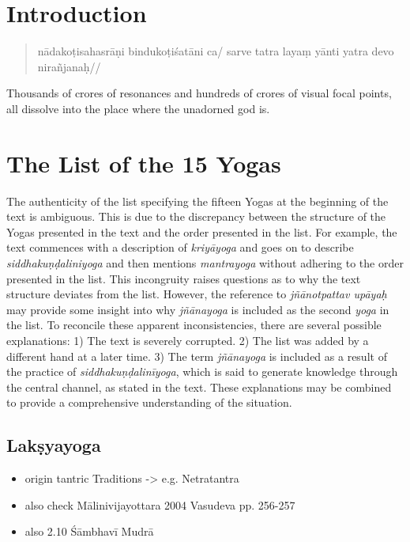 \chapter{Introduction}
\mainmatter

\begin{quote}
nādakoṭisahasrāṇi bindukoṭiśatāni ca/
sarve tatra layaṃ yānti yatra devo nirañjanaḥ//
\end{quote}

Thousands of crores of resonances and hundreds of crores of visual focal points, all dissolve into the place where the unadorned god is.


\chapter{The List of the 15 Yogas}
\label{yogas_list}
The authenticity of the list specifying the fifteen Yogas at the beginning of the text is ambiguous. This is due to the discrepancy between the structure of the Yogas presented in the text and the order presented in the list. For example, the text commences with a description of \textit{kriyāyoga} and goes on to describe \textit{siddhakuṇḍaliniyoga} and then mentions \textit{mantrayoga} without adhering to the order presented in the list. This incongruity raises questions as to why the text structure deviates from the list. However, the reference to \textit{jñānotpattav upāyaḥ} may provide some insight into why \textit{jñānayoga} is included as the second \textit{yoga} in the list. To reconcile these apparent inconsistencies, there are several possible explanations: 1) The text is severely corrupted. 2) The list was added by a different hand at a later time. 3) The term \textit{jñānayoga} is included as a result of the practice of \textit{siddhakuṇḍalinīyoga}, which is said to generate knowledge through the central channel, as stated in the text. These explanations may be combined to provide a comprehensive understanding of the situation.

\section{Lakṣyayoga}

\begin{itemize}
\item origin tantric Traditions -> e.g. Netratantra
\item also check Mālinivijayottara 2004 Vasudeva pp. 256-257
\item also  2.10 Śāmbhavī Mudrā
  \end{itemize} 

